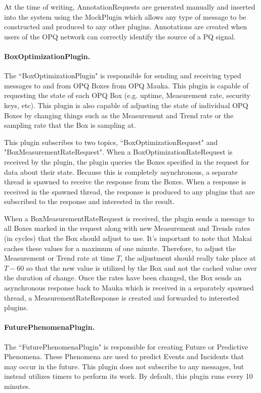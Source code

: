 At the time of writing, AnnotationRequests are generated manually and inserted into the system using the MockPlugin which allows any type of message to be constructed and produced to any other plugins. Annotations are created when users of the OPQ network can correctly identify the source of a PQ signal.

\paragraph{BoxOptimizationPlugin.}

The ``BoxOptimizationPlugin" is responsible for sending and receiving typed messages to and from OPQ Boxes from OPQ Mauka. This plugin is capable of requesting the state of each OPQ Box (e.g. uptime, Measurement rate, security keys, etc). This plugin is also capable of adjusting the state of individual OPQ Boxes by changing things such as the Measurement and Trend rate or the sampling rate that the Box is sampling at.

This plugin subscribes to two topics, ``BoxOptimizationRequest" and "BoxMeasurementRateRequest". When a BoxOptimizationRateRequest is received by the plugin, the plugin queries the Boxes specified in the request for data about their state. Because this is completely asynchronous, a separate thread is spawned to receive the response from the Boxes. When a response is received in the spawned thread, the response is produced to any plugins that are subscribed to the response and interested in the result.

When a BoxMeasurementRateRequest is received, the plugin sends a message to all Boxes marked in the request along with new Measurement and Trends rates (in cycles) that the Box should adjust to use. It's important to note that Makai caches these values for a maximum of one minute. Therefore, to adjust the Measurement or Trend rate at time $T$, the adjustment should really take place at $T - 60$ so that the new value is utilized by the Box and not the cached value over the duration of change. Once the rates have been changed, the Box sends an asynchronous response back to Mauka which is received in a separately spawned thread, a MeasurementRateResponse is created and forwarded to interested plugins.

\paragraph{FuturePhenomenaPlugin.}

The ``FuturePhenomenaPlugin" is responsible for creating Future or Predictive Phenomena. These Phenomena are used to predict Events and Incidents that may occur in the future. This plugin does not subscribe to any messages, but instead utilizes timers to perform its work. By default, this plugin runs every 10 minutes.

